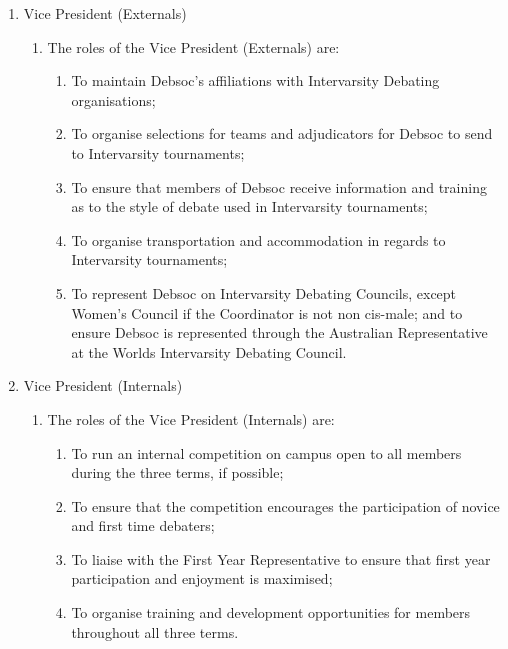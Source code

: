 \begin{enumerate}
\item Vice President (Externals)
  \begin{enumerate}
  \item The roles of the Vice President (Externals) are:
    \begin{enumerate}
    \item To maintain Debsoc’s affiliations with Intervarsity Debating organisations;
    \item To organise selections for teams and adjudicators for Debsoc to send to Intervarsity tournaments;
    \item To ensure that members of Debsoc receive information and training as to the style of debate used in Intervarsity tournaments;
    \item To organise transportation and accommodation in regards to Intervarsity tournaments;
    \item To represent Debsoc on Intervarsity Debating Councils, except Women’s Council if the Coordinator is not non cis-male; and to ensure Debsoc is represented through the Australian Representative at the Worlds Intervarsity Debating Council.
    \end{enumerate}
  \end{enumerate}

\item Vice President (Internals)
  \begin{enumerate}
  \item The roles of the Vice President (Internals) are:
    \begin{enumerate}
    \item To run an internal competition on campus open to all members during the three terms, if possible;
    \item To ensure that the competition encourages the participation of novice and first time debaters;
    \item To liaise with the First Year Representative to ensure that first year participation and enjoyment is maximised;
    \item To organise training and development opportunities for members throughout all three terms.
    \end{enumerate}
  \end{enumerate}


\end{enumerate}
